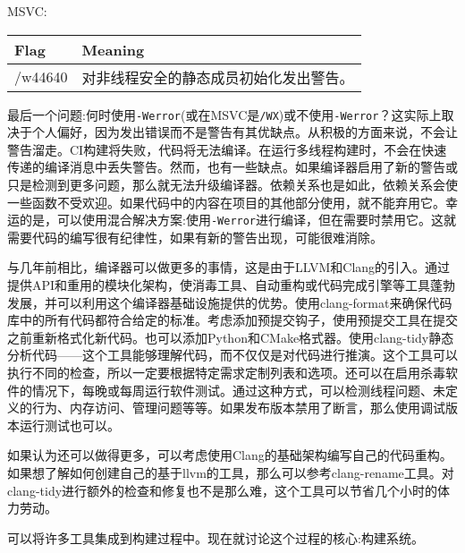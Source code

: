 MSVC:

\begin{table}[H]
	\begin{tabular}{|l|l|}
		\hline
		\textbf{Flag} & \textbf{Meaning}                                      \\ \hline
		/w44640       & 对非线程安全的静态成员初始化发出警告。 \\ \hline
	\end{tabular}
\end{table}

最后一个问题:何时使用\texttt{-Werror}(或在MSVC是\texttt{/WX})或不使用\texttt{-Werror}？这实际上取决于个人偏好，因为发出错误而不是警告有其优缺点。从积极的方面来说，不会让警告溜走。CI构建将失败，代码将无法编译。在运行多线程构建时，不会在快速传递的编译消息中丢失警告。然而，也有一些缺点。如果编译器启用了新的警告或只是检测到更多问题，那么就无法升级编译器。依赖关系也是如此，依赖关系会使一些函数不受欢迎。如果代码中的内容在项目的其他部分使用，就不能弃用它。幸运的是，可以使用混合解决方案:使用\texttt{-Werror}进行编译，但在需要时禁用它。这就需要代码的编写很有纪律性，如果有新的警告出现，可能很难消除。


与几年前相比，编译器可以做更多的事情，这是由于LLVM和Clang的引入。通过提供API和重用的模块化架构，使消毒工具、自动重构或代码完成引擎等工具蓬勃发展，并可以利用这个编译器基础设施提供的优势。使用clang-format来确保代码库中的所有代码都符合给定的标准。考虑添加预提交钩子，使用预提交工具在提交之前重新格式化新代码。也可以添加Python和CMake格式器。使用clang-tidy静态分析代码——这个工具能够理解代码，而不仅仅是对代码进行推演。这个工具可以执行不同的检查，所以一定要根据特定需求定制列表和选项。还可以在启用杀毒软件的情况下，每晚或每周运行软件测试。通过这种方式，可以检测线程问题、未定义的行为、内存访问、管理问题等等。如果发布版本禁用了断言，那么使用调试版本运行测试也可以。

如果认为还可以做得更多，可以考虑使用Clang的基础架构编写自己的代码重构。如果想了解如何创建自己的基于llvm的工具，那么可以参考clang-rename工具。对clang-tidy进行额外的检查和修复也不是那么难，这个工具可以节省几个小时的体力劳动。

可以将许多工具集成到构建过程中。现在就讨论这个过程的核心:构建系统。












